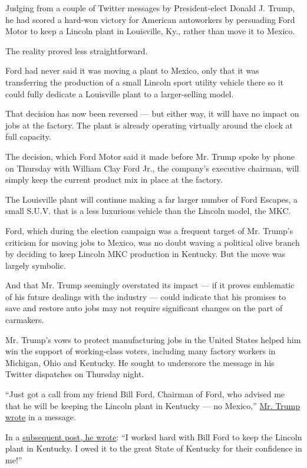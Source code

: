 Judging from a couple of Twitter messages by President-elect Donald J.
Trump, he had scored a hard-won victory for American autoworkers by
persuading Ford Motor to keep a Lincoln plant in Louisville, Ky., rather
than move it to Mexico.

The reality proved less straightforward.

Ford had never said it was moving a plant to Mexico, only that it was
transferring the production of a small Lincoln sport utility vehicle
there so it could fully dedicate a Louisville plant to a larger-selling
model.

That decision has now been reversed --- but either way, it will have no
impact on jobs at the factory. The plant is already operating virtually
around the clock at full capacity.

The decision, which Ford Motor said it made before Mr. Trump spoke by
phone on Thursday with William Clay Ford Jr., the company's executive
chairman, will simply keep the current product mix in place at the
factory.

The Louisville plant will continue making a far larger number of Ford
Escapes, a small S.U.V. that is a less luxurious vehicle than the
Lincoln model, the MKC.

Ford, which during the election campaign was a frequent target of Mr.
Trump's criticism for moving jobs to Mexico, was no doubt waving a
political olive branch by deciding to keep Lincoln MKC production in
Kentucky. But the move was largely symbolic.

And that Mr. Trump seemingly overstated its impact --- if it proves
emblematic of his future dealings with the industry --- could indicate
that his promises to save and restore auto jobs may not require
significant changes on the part of carmakers.

Mr. Trump's vows to protect manufacturing jobs in the United States
helped him win the support of working-class voters, including many
factory workers in Michigan, Ohio and Kentucky. He sought to underscore
the message in his Twitter dispatches on Thursday night.

``Just got a call from my friend Bill Ford, Chairman of Ford, who
advised me that he will be keeping the Lincoln plant in Kentucky --- no
Mexico,''
\href{https://twitter.com/realDonaldTrump/status/799432403727028224}{Mr.
Trump wrote} in a message.

In a
\href{https://twitter.com/realDonaldTrump/status/799435824622252032}{subsequent
post, he wrote}: ``I worked hard with Bill Ford to keep the Lincoln
plant in Kentucky. I owed it to the great State of Kentucky for their
confidence in me!''

